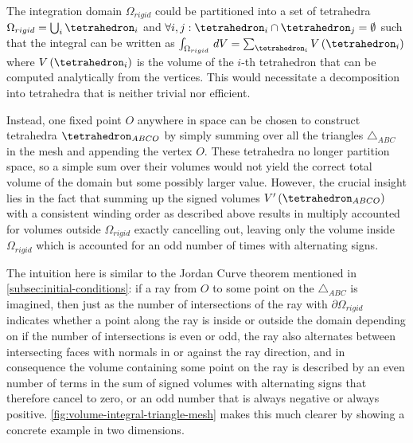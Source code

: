 \documentclass[oneside, a4paper]{book}
\newcommand\br[1]{\left(#1\right)}
\begin{document}
    The integration domain $\Omega_{rigid}$ could be partitioned into a set of tetrahedra $\Omega_{rigid} = \bigcup_i \tetrahedron_i$ and $\forall i,j: \tetrahedron_i \cap \tetrahedron_j = \emptyset$ such that the integral can be written as $\int_{\Omega_{rigid}} \,dV = \sum_{\tetrahedron_i} V\br{\tetrahedron_i}$ where $V\br{\tetrahedron_i}$ is the volume of the $i$-th tetrahedron that can be computed analytically from the vertices. This would necessitate a decomposition into tetrahedra that is neither trivial nor efficient. 
    
    Instead, one fixed point $O$ anywhere in space can be chosen to construct tetrahedra $\tetrahedron_{ABCO}$ by simply summing over all the triangles $\triangle_{ABC}$ in the mesh and appending the vertex $O$. These tetrahedra no longer partition space, so a simple sum over their volumes would not yield the correct total volume of the domain but some possibly larger value. However, the crucial insight lies in the fact that summing up the signed volumes $V'\br{\tetrahedron_{ABCO}}$ with a consistent winding order as described above results in multiply accounted for volumes outside $\Omega_{rigid}$ exactly cancelling out, leaving only the volume inside $\Omega_{rigid}$ which is accounted for an odd number of times with alternating signs. 
    
    The intuition here is similar to the Jordan Curve theorem mentioned in \autoref{subsec:initial-conditions}: if a ray from $O$ to some point on the $\triangle_{ABC}$ is imagined, then just as the number of intersections of the ray with $\partial\Omega_{rigid}$ indicates whether a point along the ray is inside or outside the domain depending on if the number of intersections is even or odd, the ray also alternates between intersecting faces with normals in or against the ray direction, and in consequence the volume containing some point on the ray is described by an even number of terms in the sum of signed volumes with alternating signs that therefore cancel to zero, or an odd number that is always negative or always positive. \autoref{fig:volume-integral-triangle-mesh} makes this much clearer by showing a concrete example in two dimensions. 
\end{document}

